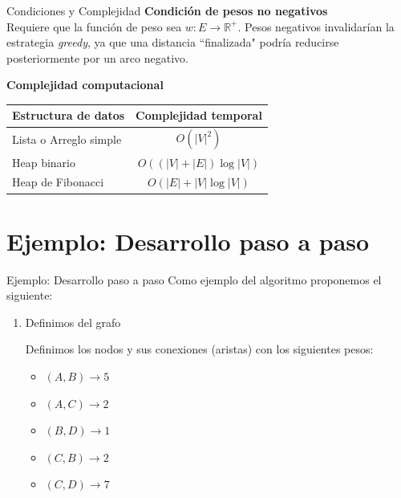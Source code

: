 \documentclass{beamer}
\begin{document}
    \begin{frame}{Condiciones y Complejidad}
        \textbf{Condición de pesos no negativos}\\
        Requiere que la función de peso sea $w:E\rightarrow\mathbb{R}^{+}$. Pesos negativos invalidarían la estrategia \textit{greedy}, ya que una distancia ``finalizada" podría reducirse posteriormente por un arco negativo.
        
        \vspace{0.3cm}
        \textbf{Complejidad computacional}
        \begin{table}[h]
        \centering
        \begin{tabular}{|l|c|}
        \hline
        \textbf{Estructura de datos} & \textbf{Complejidad temporal} \\
        \hline
        Lista o Arreglo simple & $O(|V|^2)$ \\
        Heap binario & $O((|V| + |E|) \log |V|)$ \\
        Heap de Fibonacci & $O(|E| + |V| \log |V|)$ \\
        \hline
        \end{tabular}
        \end{table}
    \end{frame}

    \section{Ejemplo: Desarrollo paso a paso}


    \begin{frame}{Ejemplo: Desarrollo paso a paso}
        Como ejemplo del algoritmo proponemos el siguiente: 

        \vspace{0.25cm}

        \begin{enumerate}
            \item Definimos del grafo

            \vspace{0.25cm}

            Definimos los nodos y sus conexiones (aristas) con los siguientes pesos: 

            \begin{itemize}
                \item $(A, B) \rightarrow 5$
                \item $(A, C) \rightarrow 2$
                \item $(B, D) \rightarrow 1$
                \item $(C, B) \rightarrow 2$
                \item $(C, D) \rightarrow 7$
            \end{itemize}
        \end{enumerate}
    \end{frame}
\end{document}
